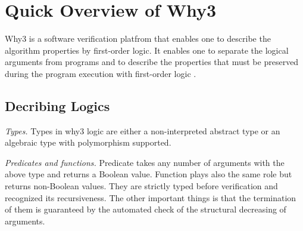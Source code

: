 \documentclass[a4paper,12pt]{article}
\begin{document}
\begin{algorithm}
\caption{$ \initBF (G,s) $}
\begin{algorithmic}[1]
\ENDFOR
{}
\end{algorithmic}
\end{algorithm}

\begin{algorithm}
\caption{$ \relaxBF (u,v,l) $}
\begin{algorithmic}[1]
\ENDIF
\end{algorithmic}
\end{algorithm}

\begin{algorithm}
\caption{$ \mainBF (G,s,l) $}\label{alg:bf}
\begin{algorithmic}[1]
\ENDFOR
\ENDFOR
{}
\ENDIF
\ENDFOR
{}
\end{algorithmic}
\end{algorithm}


\section{Quick Overview of Why3}

Why3 is a software verification platfrom that enables one to describe the algorithm properties by first-order logic. It enables one to separate the logical arguments from programs and to describe the properties that must be preserved during the program execution with first-order logic \cite{why3}.




\subsection{Decribing Logics}

\emph{Types.} Types in why3 logic are either a non-interpreted abstract type or an algebraic type with polymorphism supported.

\emph{Predicates and functions.} Predicate takes any number of arguments with the above type and returns a Boolean value. Function plays also the same role but returns non-Boolean values. They are strictly typed before verification and recognized its recursiveness. The other important things is that the termination of them is guaranteed by the automated check of the structural decreasing of arguments.
\end{document}
